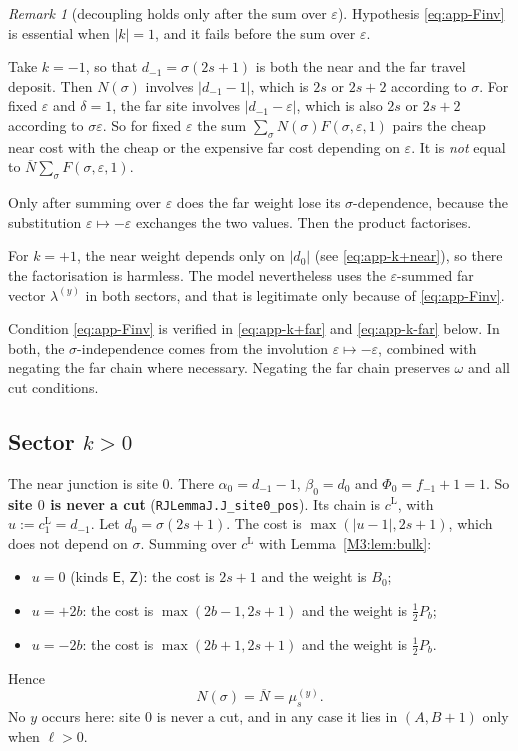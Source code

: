 \documentclass[11pt]{article}
\theoremstyle{plain}
\theoremstyle{definition}
\theoremstyle{remark}
\newtheorem{remark}[theorem]{Remark}
\begin{document}
\begin{remark}[decoupling holds only after the sum over $\varepsilon$]\label{M3:rem:eps}
Hypothesis \eqref{eq:app-Finv} is essential when $|k|=1$, and it fails before the sum over
$\varepsilon$.

Take $k=-1$, so that $d_{-1}=\sigma(2s+1)$ is both the near and the far travel deposit. Then
$N(\sigma)$ involves $|d_{-1}-1|$, which is $2s$ or $2s+2$ according to $\sigma$. For fixed
$\varepsilon$ and $\delta=1$, the far site involves $|d_{-1}-\varepsilon|$, which is also
$2s$ or $2s+2$ according to $\sigma\varepsilon$. So for fixed $\varepsilon$ the sum
$\sum_\sigma N(\sigma)F(\sigma,\varepsilon,1)$ pairs the cheap near cost with the cheap or
the expensive far cost depending on $\varepsilon$. It is \emph{not} equal to
$\overline N\sum_\sigma F(\sigma,\varepsilon,1)$.

Only after summing over $\varepsilon$ does the far weight lose its $\sigma$-dependence,
because the substitution $\varepsilon\mapsto-\varepsilon$ exchanges the two values. Then the
product factorises.

For $k=+1$, the near weight depends only on $|d_0|$ (see \eqref{eq:app-k+near}), so there
the factorisation is harmless. The model nevertheless uses the $\varepsilon$-summed far
vector $\lambda^{(y)}$ in both sectors, and that is legitimate only because of
\eqref{eq:app-Finv}.
\end{remark}

Condition \eqref{eq:app-Finv} is verified in \eqref{eq:app-k+far} and \eqref{eq:app-k-far}
below. In both, the $\sigma$-independence comes from the involution
$\varepsilon\mapsto-\varepsilon$, combined with negating the far chain where necessary.
Negating the far chain preserves $\omega$ and all cut conditions.

\subsection{Sector $k>0$}\label{app:kpos}

The near junction is site $0$. There $\alpha_0=d_{-1}-1$, $\beta_0=d_0$ and
$\Phi_0=f_{-1}+1=1$. So \textbf{site $0$ is never a cut} (\texttt{RJLemmaJ.J\_site0\_pos}).
Its chain is $c^{\mathrm L}$, with $u:=c^{\mathrm L}_1=d_{-1}$. Let $d_0=\sigma(2s+1)$. The
cost is $\max(|u-1|,2s+1)$, which does not depend on $\sigma$. Summing over $c^{\mathrm L}$
with Lemma~\ref{M3:lem:bulk}:
\begin{itemize}
\item $u=0$ (kinds $\mathsf E$, $\mathsf Z$): the cost is $2s+1$ and the weight is $B_0$;
\item $u=+2b$: the cost is $\max(2b-1,2s+1)$ and the weight is $\tfrac12P_b$;
\item $u=-2b$: the cost is $\max(2b+1,2s+1)$ and the weight is $\tfrac12P_b$.
\end{itemize}
Hence
\begin{equation}\label{eq:app-k+near}
  N(\sigma)=\overline N=\mu^{(y)}_s .
\end{equation}
No $y$ occurs here: site $0$ is never a cut, and in any case it lies in $(A,B+1)$ only when
$\ell>0$.
\end{document}
